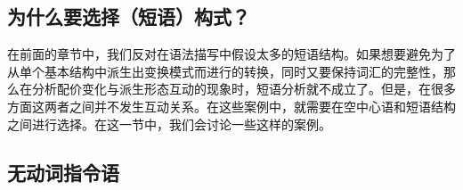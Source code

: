 \begin{exe}
\begin{xlist}[iv.]
\begin{exe}
\begin{xlist}[iv.]
\section{为什么要选择（短语）构式？}
\label{Abschnitt-Phrasale-Konstruktionen}\label{sec-why-phrasal}

在前面的章节中，我们反对在语法描写中假设太多的短语结构。如果想要避免为了从单个基本结构中派生出变换模式而进行的转换，同时又要保持词汇的完整性，那么在分析配价变化与派生形态互动的现象时，短语分析就不成立了。但是，在很多方面这两者之间并不发生互动关系。在这些案例中，就需要在空中心语和短语结构之间进行选择。在这一节中，我们会讨论一些这样的案例。

\subsection{无动词指令语}
\label{Abschnitt-Phrasale-Konstruktionen-Jacobs}


\end{xlist}
\end{exe}
\end{xlist}
\end{exe}
